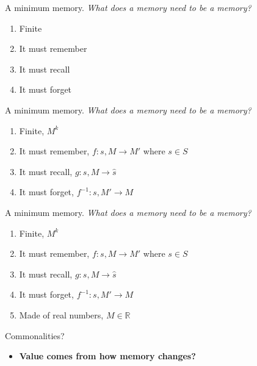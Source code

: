 \documentclass[10pt]{beamer}
\begin{document}
\begin{frame}[fragile]{A minimum memory.}
\textit{What does a memory need to be a memory?}
\begin{enumerate}
    \item Finite
    \item It must remember
    \item It must recall
    \item It must forget
\end{enumerate}
\end{frame}

\begin{frame}[fragile]{A minimum memory.}
\textit{What does a memory need to be a memory?}
\begin{enumerate}
    \item Finite, $M^k$
    \item It must remember, $f : s, M \rightarrow M'$ where $s \in S$
    \item It must recall, $g : s, M \rightarrow \hat s$
    \item It must forget, $f^{-1} : s, M' \rightarrow M$
\end{enumerate}
\end{frame}

\begin{frame}[fragile]{A minimum memory.}
\textit{What does a memory need to be a memory?}
\begin{enumerate}
    \item Finite, $M^k$
    \item It must remember, $f : s, M \rightarrow M'$ where $s \in S$
    \item It must recall, $g : s, M \rightarrow \hat s$
    \item It must forget, $f^{-1} : s, M' \rightarrow M$
    \item Made of real numbers, $M \in \mathbb{R}$
\end{enumerate}
\end{frame}

\begin{frame}[fragile]{Commonalities?}
\begin{itemize}
    \begin{itemize}
    \item Novelty
    \item Counts/Successors
    \item Information gain
    \item Mutual information
    \item State prediction
    \end{itemize} \\
    \item \textbf{Value comes from how memory changes?}
\end{itemize}
\end{frame}
\end{document}
